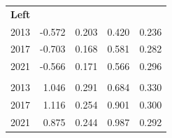 \begin{table}[!h]
{\begin{tabular}[t]{rrrrr}
\multicolumn{5}{l}{\textbf{Left}}\\
\hspace{1em}2013 & -0.572 & 0.203 & 0.420 & 0.236\\
\hspace{1em}2017 & -0.703 & 0.168 & 0.581 & 0.282\\
\hspace{1em}2021 & -0.566 & 0.171 & 0.566 & 0.296\\
\addlinespace[0.3em]
\multicolumn{5}{l}{\textbf{AfD}}\\
\hspace{1em}2013 & 1.046 & 0.291 & 0.684 & 0.330\\
\hspace{1em}2017 & 1.116 & 0.254 & 0.901 & 0.300\\
\hspace{1em}2021 & 0.875 & 0.244 & 0.987 & 0.292\\
\bottomrule
\end{tabular}}
\end{table}
